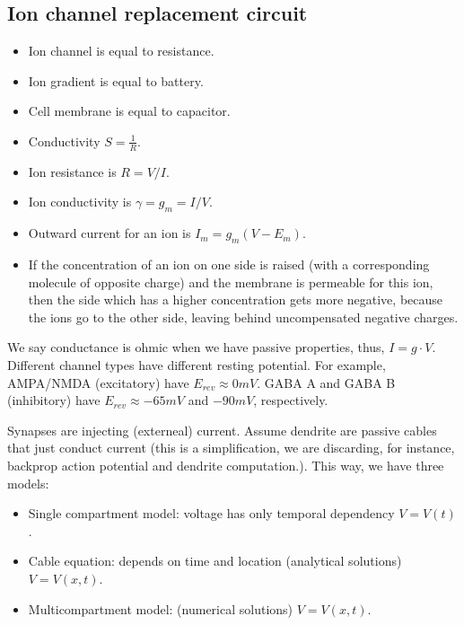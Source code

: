 \documentclass[main]{subfiles}
\begin{document}
\subsection{Ion channel replacement circuit}
\begin{itemize}[noitemsep,nolistsep]
	\item Ion channel is equal to resistance.
	\item Ion gradient is equal to battery.
	\item Cell membrane is equal to capacitor.
	\item Conductivity $S=\frac{1}{R}$.
	\item Ion resistance is $R = V/I$.
	\item Ion conductivity is $\gamma = g_m = I/V$.
	\item Outward current for an ion is $I_m=g_m(V-E_m)$.
	\item If the concentration of an ion on one side is raised (with a corresponding molecule of opposite charge) and the membrane is permeable for this ion, then the side which has a higher concentration gets more negative, because the ions go to the other side, leaving behind uncompensated negative charges.
\end{itemize}
\begin{figure}[H]
	\centering
\end{figure}
\begin{figure}[H]
	\centering
\end{figure}

We say conductance is ohmic when we have passive properties, thus, $I = g \cdot V$.
Different channel types have different resting potential. For example, AMPA/NMDA (excitatory) have $E_{rev} \approx 0 mV$. GABA A and GABA B (inhibitory) have $E_{rev} \approx -65 mV$ and $-90 mV$, respectively.

Synapses are injecting (externeal) current.
Assume dendrite are passive cables that just conduct current (this is a simplification, we are discarding, for instance, backprop action potential and dendrite computation.). This way, we have three models:
\begin{itemize}
\item Single compartment model: voltage has only temporal dependency $V = V(t)$.
\item Cable equation: depends on time and location (analytical solutions) $V = V(x,t)$.
\item Multicompartment model: (numerical solutions) $V = V(x,t)$.
\end{itemize}
\end{document}

